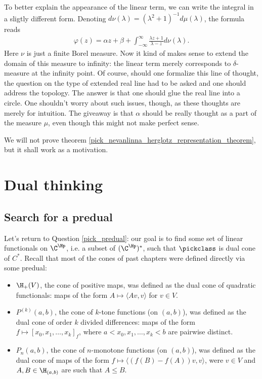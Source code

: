 To better explain the appearance of the linear term, we can write the integral in a sligtly different form. Denoting $d \nu(\lambda) = (\lambda^2 + 1)^{-1} d \mu(\lambda)$, the formula reads
\begin{align*}
	\varphi(z) = \alpha z + \beta + \int_{-\infty}^{\infty} \frac{\lambda z + 1}{\lambda - z} d \nu(\lambda).
\end{align*}
Here $\nu$ is just a finite Borel measure. Now it kind of makes sense to extend the domain of this measure to infinity: the linear term merely corresponds to $\delta$-measure at the infinity point. Of course, should one formalize this line of thought, the question on the type of extended real line had to be asked and one should address the topology. The answer is that one should glue the real line into a circle. One shouldn't worry about such issues, though, as these thoughts are merely for intuition. The giveaway is that $\alpha$ should be really thought as a part of the measure $\mu$, even though this might not make perfect sense.

We will not prove theorem \ref{pick_nevanlinna_herglotz_representation_theorem}, but it shall work as a motivation.

\section{Dual thinking}

\subsection{Search for a predual}

Let's return to Question \ref{pick_predual}: our goal is to find some set of linear functionals on $\C^{\Hp}$, i.e. a subset of $(\C^{\Hp})^{*}$, such that $\pickclass$ is dual cone of $C^{*}$. Recall that most of the cones of past chapters were defined directly via some predual:

\begin{itemize}
	\item $\H_{+}(V)$, the cone of positive maps, was defined as the dual cone of quadratic functionals: maps of the form $A \mapsto \langle A v, v \rangle$ for $v \in V$.
	\item $P^{(k)}(a, b)$, the cone of $k$-tone functions (on $(a, b)$), was defined as the dual cone of order $k$ divided differences: maps of the form $f \mapsto [x_{0}, x_{1}, \ldots, x_{k}]_{f}$, where $a < x_{0}, x_{1}, \ldots, x_{k} < b$ are pairwise distinct.
	\item $P_{n}(a, b)$, the cone of $n$-monotone functions (on $(a, b)$), was defined as the dual cone of maps of the form $f \mapsto \langle (f(B) - f(A)) v, v \rangle$, were $v \in V$ and $A, B \in \H_{(a, b)}$ are such that $A \leq B$.
\end{itemize}

